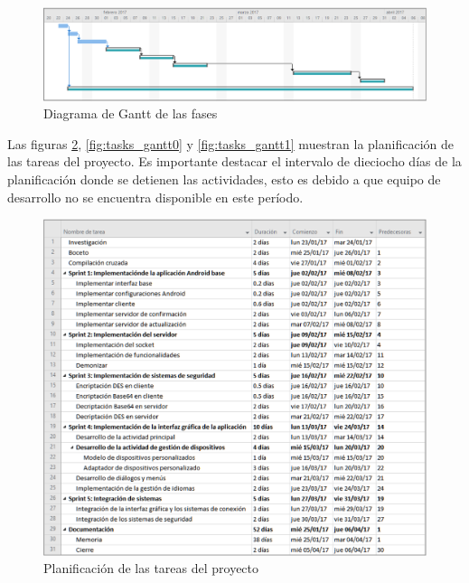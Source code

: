\documentclass[12pt]{article}
\begin{document}
        \begin{figure}[h!]
            \centering
                \includegraphics[scale=0.7]{fases_gantt.eps}
                \caption{Diagrama de Gantt de las fases}
                \label{fig:fases_gantt}
        \end{figure}

        Las figuras \ref{fig:tasks}, \ref{fig:tasks_gantt0} y \ref{fig:tasks_gantt1} muestran la planificación de las tareas del proyecto. Es importante destacar el intervalo de dieciocho días de la planificación donde se detienen las actividades, esto es debido a que equipo de desarrollo no se encuentra disponible en este período.

        \begin{figure}[h!]
            \centering
                \includegraphics[scale=0.7]{tasks.eps}
                \caption{Planificación de las tareas del proyecto}
                \label{fig:tasks}
        \end{figure}
\end{document}
